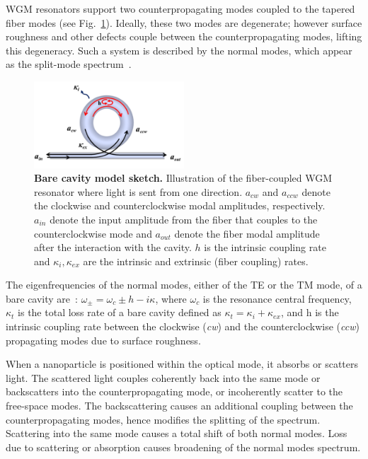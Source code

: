 \documentclass[journal=jacsat,manuscript=article]{achemso}
\begin{document}
WGM resonators support two counterpropagating modes coupled to the tapered fiber modes (see Fig.~\ref{fig:torusTMTE}). Ideally, these two modes are degenerate; however surface roughness and other defects couple between the counterpropagating modes, lifting this degeneracy. Such a system is described by the normal modes, which appear as the split-mode spectrum~\cite{Haroche1995splitting,Kippenberg:02,zhu2010,kim2010}.
\begin{figure}[H]
\centering
             \includegraphics[trim=0cm 1.0cm 0.5cm 0.5cm, clip, width=0.5\textwidth]{Images/cw_ccw.png}
             \caption{\textbf{Bare cavity model sketch.} Illustration of the fiber-coupled WGM resonator where light is sent from one direction. $a_{cw}$ and $a_{ccw}$ denote the clockwise and counterclockwise modal amplitudes, respectively. $a_{in}$ denote the input amplitude from the fiber that couples to the counterclockwise mode and $a_{out}$ denote the fiber modal amplitude after the interaction with the cavity. $h$ is the intrinsic coupling rate and $\kappa_i, \kappa_{ex}$ are the intrinsic and extrinsic (fiber coupling) rates. 
              \label{fig:torusTMTE}}
  \end{figure}
The eigenfrequencies of the normal modes, either of the TE or the TM mode, of a bare cavity are~\cite{mazzei2007}: $\displaystyle \omega_{\pm}=\omega_c \pm h - i \kappa$, where $\omega_c$ is the resonance central frequency, $\kappa_t$ is the total loss rate of a bare cavity defined as $\kappa_t = \kappa_i + \kappa_{ex}$, and $\textit{h}$ is the intrinsic coupling rate between the clockwise (\textit{cw}) and the counterclockwise (\textit{ccw}) propagating modes due to surface roughness.

When a nanoparticle is positioned within the optical mode, it absorbs or scatters light. The scattered light couples coherently back into the same mode or backscatters into the counterpropagating mode, or incoherently scatter to the free-space modes. The backscattering causes an additional coupling between the counterpropagating modes, hence modifies the splitting of the spectrum. Scattering into the same mode causes a total shift of both normal modes. Loss due to scattering or absorption causes broadening of the normal modes spectrum.
\end{document}
